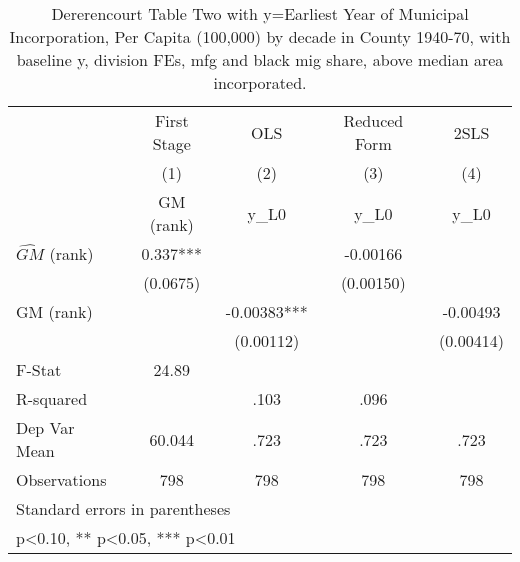 \begin{table}[htbp]\centering
\def\sym#1{\ifmmode^{#1}\else\(^{#1}\)\fi}
\caption{Dererencourt Table Two with y=Earliest Year of Municipal Incorporation, Per Capita (100,000) by decade in County 1940-70, with baseline y, division FEs, mfg and black mig share, above median area incorporated.}
\begin{tabular}{l*{4}{c}}
\toprule
                    & First Stage   &         OLS   &Reduced Form   &        2SLS   \\
                    &\multicolumn{1}{c}{(1)}&\multicolumn{1}{c}{(2)}&\multicolumn{1}{c}{(3)}&\multicolumn{1}{c}{(4)}\\
                    &\multicolumn{1}{c}{GM  (rank)}&\multicolumn{1}{c}{y\_L0}&\multicolumn{1}{c}{y\_L0}&\multicolumn{1}{c}{y\_L0}\\
\midrule
$\hat{GM}$ (rank)   &       0.337***&               &    -0.00166   &               \\
                    &    (0.0675)   &               &   (0.00150)   &               \\
\addlinespace
GM  (rank)          &               &    -0.00383***&               &    -0.00493   \\
                    &               &   (0.00112)   &               &   (0.00414)   \\
\midrule
F-Stat              &       24.89   &               &               &               \\
R-squared           &               &        .103   &        .096   &               \\
Dep Var Mean        &      60.044   &        .723   &        .723   &        .723   \\
Observations        &         798   &         798   &         798   &         798   \\
\bottomrule
\multicolumn{5}{l}{\footnotesize Standard errors in parentheses}\\
\multicolumn{5}{l}{\footnotesize * p<0.10, ** p<0.05, *** p<0.01}\\
\end{tabular}
\end{table}
